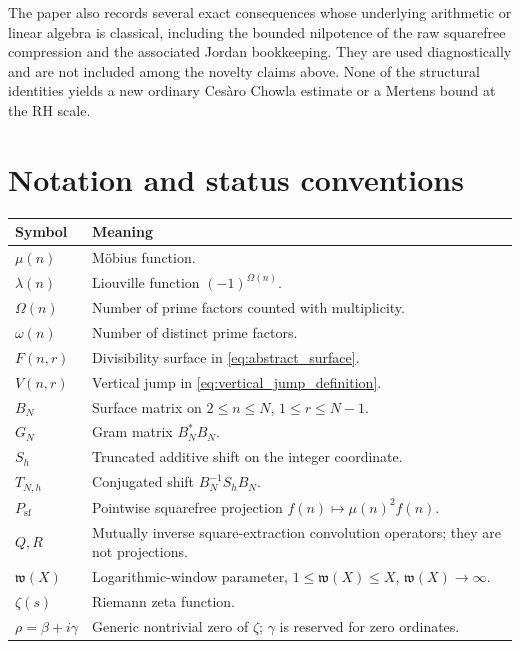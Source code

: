 \documentclass[11pt]{amsart}
\numberwithin{equation}{section}
\theoremstyle{plain}
\theoremstyle{definition}
\theoremstyle{remark}
\newcommand{\mob}{\mu}
\newcommand{\liou}{\lambda}
\newcommand{\Fsurf}{F}
\newcommand{\Vjump}{V}
\newcommand{\what}{\mathfrak w}
\begin{document}
The paper also records several exact consequences whose underlying arithmetic or linear algebra is classical, including the bounded nilpotence of the raw squarefree compression and the associated Jordan bookkeeping.  They are used diagnostically and are not included among the novelty claims above.  None of the structural identities yields a new ordinary Cesàro Chowla estimate or a Mertens bound at the RH scale.

\section{Notation and status conventions}
\label{sec:notation}

\begin{center}
\begin{tabular}{>{\raggedright\arraybackslash}p{} >{\raggedright\arraybackslash}p{}}
\toprule
Symbol & Meaning\\
\midrule
$\mob(n)$ & Möbius function.\\
$\liou(n)$ & Liouville function $(-1)^{\Omega(n)}$.\\
$\Omega(n)$ & Number of prime factors counted with multiplicity.\\
$\omega(n)$ & Number of distinct prime factors.\\
$\Fsurf(n,r)$ & Divisibility surface in \eqref{eq:abstract_surface}.\\
$\Vjump(n,r)$ & Vertical jump in \eqref{eq:vertical_jump_definition}.\\
$B_N$ & Surface matrix on $2\le n\le N$, $1\le r\le N-1$.\\
$G_N$ & Gram matrix $B_N^*B_N$.\\
$S_h$ & Truncated additive shift on the integer coordinate.\\
$T_{N,h}$ & Conjugated shift $B_N^{-1}S_hB_N$.\\
$P_{\mathrm{sf}}$ & Pointwise squarefree projection $f(n)\mapsto\mob(n)^2f(n)$.\\
$Q,R$ & Mutually inverse square-extraction convolution operators; they are not projections.\\
$\what(X)$ & Logarithmic-window parameter, $1\le\what(X)\le X$, $\what(X)\to\infty$.\\
$\zeta(s)$ & Riemann zeta function.\\
$\rho=\beta+i\gamma$ & Generic nontrivial zero of $\zeta$; $\gamma$ is reserved for zero ordinates.\\
\bottomrule
\end{tabular}
\end{center}
\end{document}
